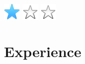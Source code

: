 \documentclass[]{cv-class}
\begin{document}
\begin{aside}
{    \includegraphics[scale=0.30]{img/star.png}
    \includegraphics[scale=0.30]{img/star_empty.png}
    \includegraphics[scale=0.30]{img/star_empty.png}}
    ~
\end{aside}

\vspace{0.75cm}
\section{Experience}
\end{document}
